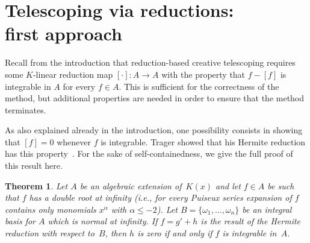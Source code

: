 \documentclass{sig-alternate}
\newtheorem{theorem}{Theorem}
\begin{document}
\section{Telescoping via reductions: \\ first approach} \label{SECT:CT-1}
Recall from the introduction that reduction-based creative telescoping requires
some $K$-linear reduction map $[\cdot]\colon A\to A$ with the property that
$f-[f]$ is integrable in $A$ for every $f\in A$. This is sufficient for the
correctness of the method, but additional properties are needed in order to
ensure that the method terminates.

As also explained already in the introduction, one possibility consists in
showing that $[f]=0$ whenever $f$ is integrable. Trager showed that his
Hermite reduction has this property~\cite[page 50, Theorem 1]{trager84}. For the sake of self-containedness,
we give the full proof of this result here.

\begin{theorem}\label{thm:intiff0}
  Let $A$ be an algebraic extension of~$K(x)$ and let $f\in A$ be such that
  $f$ has a double root at infinity (i.e., for every Puiseux series expansion
  of $f$ contains only monomials $x^\alpha$ with $\alpha\leq-2$). Let $B=\{\omega_1,\dots,\omega_n\}$
  be an integral basis for $A$ which is normal at infinity.
  If $f=g'+h$ is the result of the Hermite reduction with respect to~$B$,
  then $h$ is zero if and only if $f$ is integrable in~$A$.
\end{theorem}
\end{document}

